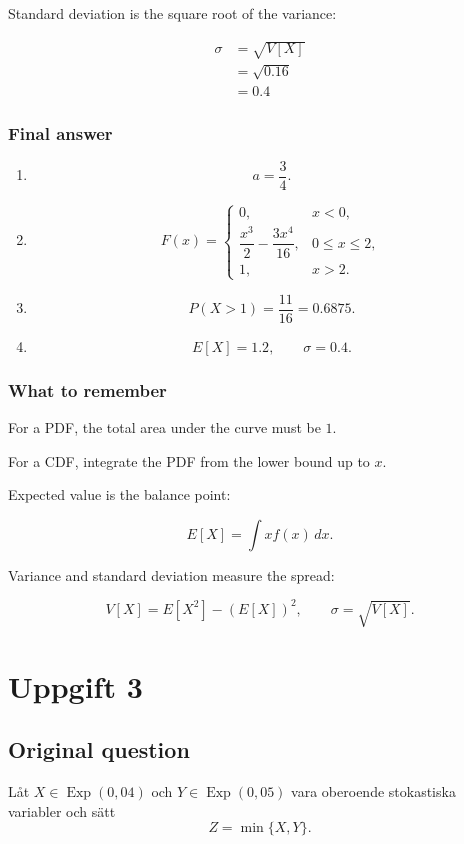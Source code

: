 \documentclass[10pt]{article}
\begin{document}
Standard deviation is the square root of the variance:

\begin{align*}
\sigma
&=
\sqrt{V[X]} \\[2mm]
&=
\sqrt{0.16} \\[2mm]
&=0.4
\end{align*}

\subsubsection*{Final answer}
\begin{enumerate}[label=\alph*)]
\item
\[
a=\frac{3}{4}.
\]

\item
\[
F(x)=
\begin{cases}
0,
& x<0,\\
\dfrac{x^3}{2}
-\dfrac{3x^4}{16},
& 0\leq x\leq 2,\\
1,
& x>2.
\end{cases}
\]

\item
\[
P(X>1)=\frac{11}{16}=0.6875.
\]

\item
\[
E[X]=1.2,
\qquad
\sigma=0.4.
\]
\end{enumerate}

\subsubsection*{What to remember}
For a PDF, the total area under the curve must be $1$.

For a CDF, integrate the PDF from the lower bound up to $x$.

Expected value is the balance point:

\[
E[X]=\int x f(x)\,dx.
\]

Variance and standard deviation measure the spread:

\[
V[X]=E[X^2]-(E[X])^2,
\qquad
\sigma=\sqrt{V[X]}.
\]

\section*{Uppgift 3}

\subsection*{Original question}
Låt $X \in \operatorname{Exp}(0,04)$ och
$Y \in \operatorname{Exp}(0,05)$ vara oberoende stokastiska variabler
och sätt
\[
Z=\min\{X,Y\}.
\]
\end{document}
